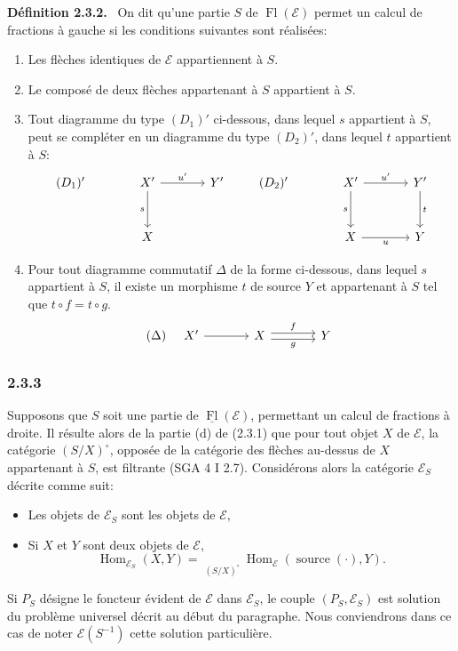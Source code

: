 \documentclass[11pt]{article}
\newenvironment{statement}[1]{\par\medskip\noindent\textbf{#1.}\ }{\par\medskip}
\DeclareMathOperator{\Hom}{Hom}
\providecommand{\Hom}{\operatorname{Hom}}
\providecommand{\Fl}{\operatorname{Fl}}
\providecommand{\cE}{\mathcal E}
\providecommand{\source}{\operatorname{source}}
\providecommand{\Hom}{\operatorname{Hom}}
\begin{document}
\begin{statement}{Définition 2.3.2}
On dit qu'une partie $S$ de $\Fl(\cE)$ permet un calcul de fractions à gauche si les conditions suivantes sont réalisées:
\begin{enumerate}[label=(\alph*)]
\item[(a')] Les flèches identiques de $\cE$ appartiennent à $S$.
\item[(b')] Le composé de deux flèches appartenant à $S$ appartient à $S$.
\item[(c')] Tout diagramme du type $(D_1)'$ ci-dessous, dans lequel $s$ appartient à $S$,
peut se compléter en un diagramme du type $(D_2)'$, dans lequel $t$ appartient à $S$:
\[
\begin{tikzcd}[column sep=large,row sep=large]
(D_1)'& X' \arrow[r,"u'"] \arrow[d,"s"'] & Y'\\
& X
\end{tikzcd}
\qquad
\begin{tikzcd}[column sep=large,row sep=large]
(D_2)'& X' \arrow[r,"u'"] \arrow[d,"s"'] & Y' \arrow[d,"t"]\\
& X \arrow[r,"u"'] & Y
\end{tikzcd}
\]
\item[(d)'] Pour tout diagramme commutatif $\Delta$ de la forme ci-dessous, dans lequel $s$ appartient à $S$, il existe un morphisme $t$ de source $Y$ et appartenant à $S$ tel que $t\circ f=t\circ g$.
\[
(\Delta)\quad
\begin{tikzcd}[column sep=large]
X' \arrow[r] & X \arrow[r,shift left,"f"] \arrow[r,shift right,"g"'] & Y
\end{tikzcd}
\]
\end{enumerate}
\end{statement}

\subsubsection*{2.3.3}
Supposons que $S$ soit une partie de $\underline{\Fl}(\cE)$, permettant un calcul de fractions à droite. Il résulte alors de la partie (d) de (2.3.1) que pour tout objet $X$ de $\cE$, la catégorie $(S/X)^\circ$, opposée de la catégorie des flèches au-dessus de $X$ appartenant à $S$, est filtrante (SGA 4 I 2.7). Considérons alors la catégorie $\cE_S$ décrite comme suit:
\begin{itemize}[label=-]
\item Les objets de $\cE_S$ sont les objets de $\cE$,
\item Si $X$ et $Y$ sont deux objets de $\cE$,
\[
\Hom_{\cE_S}(X,Y)=\mathop{\underrightarrow{\mathrm{Lim}}}\limits_{(S/X)^\circ}\Hom_{\cE}(\source(\cdot),Y).
\]
\end{itemize}
Si $P_S$ désigne le foncteur évident de $\cE$ dans $\cE_S$, le couple $(P_S,\cE_S)$ est solution du problème universel décrit au début du paragraphe. Nous conviendrons dans ce cas de noter $\cE(S^{-1})$ cette solution particulière.
\end{document}
